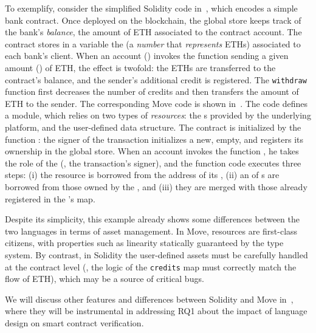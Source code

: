 To exemplify, consider the simplified Solidity code in~, which encodes a simple bank contract. Once deployed on the blockchain, the global store keeps track of the bank's \emph{balance}, \ie the amount of ETH associated to the contract account. The contract stores in a variable the  (a \emph{number} that \emph{represents} ETHs) associated to each bank's client. 
When an account () invokes the function  sending a given amount () of ETH, the effect is twofold: the ETHs are transferred to the contract's balance, and the sender's additional credit is registered.
The  {\tt withdraw} function first decreases the number of credits and then transfers the amount of ETH to the sender. 
%
The corresponding Move code is shown in~. The code defines a  module, which relies on two types of \emph{resources}: the s provided by the underlying platform, and the user-defined  data structure. The contract is initialized by the function : the signer of the transaction initializes a new, empty,  and registers its ownership in the global store. When an account invokes the function , he takes the role of the  (\ie, the transaction's signer), and the function code executes three steps: (i) the  resource is borrowed from the address of its ,  (ii) an  of s are borrowed from those owned by the , and (iii) they are merged with those already registered in the 's  map.  

Despite its simplicity, this example already shows some differences between the two languages in terms of asset management. 
In Move, resources are first-class citizens, with properties such as linearity statically guaranteed by the type system.
By contrast, in Solidity the user-defined assets must be carefully handled at the contract level (\eg, the logic of the {\tt credits} map must correctly match the flow of ETH), which may be a source of critical bugs. 

We will discuss other features and differences between Solidity and Move in~, where they will be instrumental in addressing RQ1 about the impact of language design on smart contract verification.


